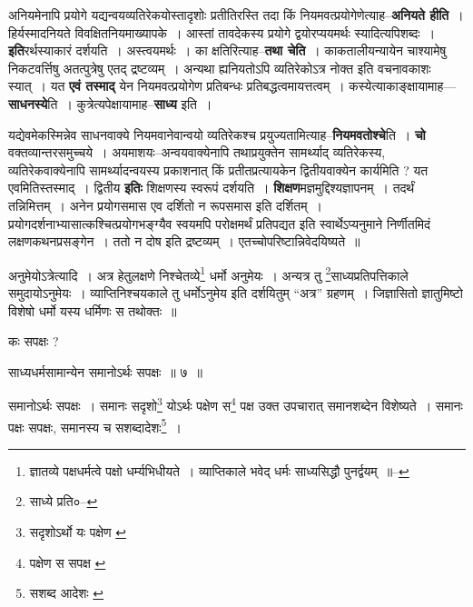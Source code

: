 \documentclass[article,12pt,a4paper]{memoir}
\begin{document}
	  \pstart अनियमेनापि प्रयोगे यद्यन्वयव्यतिरेकयोस्तादृशोः प्रतीतिरस्ति तदा किं नियमवत्प्रयोगेणेत्याह--\textbf{अनियते हीति} । हिर्यस्मादनियते विवक्षितनियमाख्यापके । आस्तां तावदेकस्य प्रयोगे द्वयोरप्ययमर्थः स्यादित्यपिशब्दः । \textbf{इति}रर्थस्याकारं दर्शयति । अस्त्वयमर्थः । का क्षतिरित्याह--\textbf{तथा चेति} । काकतालीयन्यायेन चाश्यामेषु निकटवर्त्तिषु अतत्पुत्रेषु एतद् द्रष्टव्यम् । अन्यथा ह्यनियतोऽपि व्यतिरेकोऽत्र नोक्त इति वचनावकाशः स्यात् । यत \textbf{एवं तस्माद्} येन नियमवत्प्रयोगेण प्रतिबन्धः प्रतिबद्धत्वमायत्तत्वम् । कस्येत्याकाङ्क्षायामाह—\textbf{साधनस्ये}ति । कुत्रेत्यपेक्षायामाह--\textbf{साध्य} इति ।
	\pend
      

	  \pstart यद्येवमेकस्मिन्नेव साधनवाक्ये नियमवानेवान्वयो व्यतिरेकश्च प्रयुज्यतामित्याह--\textbf{नियमवतोश्चे}ति । \textbf{चो} वक्तव्यान्तरसमुच्चये । अयमाशयः--अन्वयवाक्येनापि तथाप्रयुक्तेन सामर्थ्याद् व्यतिरेकस्य, व्यतिरेकवाक्येनापि सामर्थ्यादन्वयस्य प्रकाशनात् किं प्रतीतप्रत्यायकेन द्वितीयवाक्येन कार्यमिति ? यत एवमितिस्तस्माद् । द्वितीय \textbf{इतिः} शिक्षणस्य स्वरूपं दर्शयति । \textbf{शिक्षण}मज्ञमुद्दिश्यज्ञापनम् । तदर्थं तन्निमित्तम् । अनेन प्रयो\leavevmode{}गसमास एव दर्शितो न रूपसमास इति दर्शितम् । प्रयोगदर्शनाभ्यासात्कश्चित्प्रयोगभङ्ग्यैव स्वयमपि परोक्षमर्थं प्रतिपद्यत इति स्वार्थेऽप्यनुमाने निर्णीतमिदं लक्षणकथनप्रसङ्गेन । ततो न दोष इति द्रष्टव्यम् । एतच्चोपरिष्टान्निवेदयिष्यते ॥
	\pend
	  \bigskip
	  \begingroup
	

	  \pstart अनुमेयोऽत्रेत्यादि । अत्र हेतुलक्षणे निश्चेतव्ये\footnote{ज्ञातव्ये पक्षधर्मत्वे पक्षो धर्म्यभिधीयते । व्याप्तिकाले भवेद् धर्मः साध्यसिद्धौ पुनर्द्वयम् ॥--\cite{dp-msD-n}} धर्मो अनुमेयः । अन्यत्र तु \footnote{साध्ये प्रति०--\cite{dp-msC}}\-साध्यप्रतिपत्तिकाले समुदायोऽनुमेयः । व्याप्तिनिश्चयकाले तु धर्मोऽनुमेय इति दर्शयितुम् “अत्र” ग्रहणम् । जिज्ञासितो ज्ञातुमिष्टो विशेषो धर्मो यस्य धर्मिणः स तथोक्तः ॥
	\pend
       

	  \pstart कः सपक्षः ?
	\pend
       
	  \bigskip
	  \begingroup
	

	  \pstart साध्यधर्मसामान्येन समानोऽर्थः सपक्षः ॥ ७ ॥
	\pend
      
	  \endgroup
	 

	  \pstart समानोऽर्थः सपक्षः । समानः सदृशो\footnote{सदृशोऽर्थो यः पक्षेण \cite{dp-msC}} योऽर्थः पक्षेण स\footnote{पक्षेण स सपक्ष \cite{dp-msB} \cite{dp-msC} \cite{dp-msD} \cite{dp-edP} \cite{dp-edH} \cite{dp-edE} \cite{dp-edN}} पक्ष उक्त उपचारात् समानशब्देन विशेष्यते । समानः पक्षः सपक्षः, समानस्य च सशब्दादेशः\footnote{सशब्द आदेशः \cite{dp-edE}} ।
	\pend
      
\end{document}
